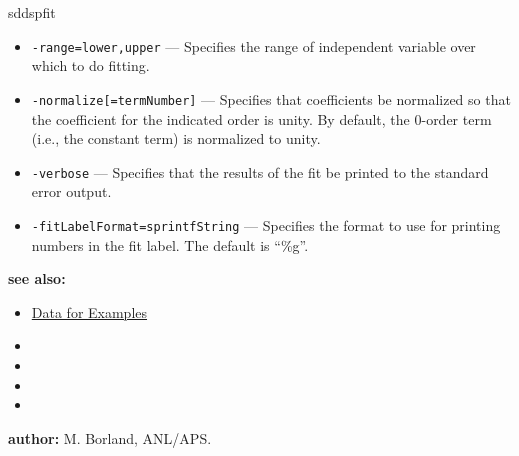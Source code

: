 \begin{sddsprog}{sddspfit}
\begin{itemize}
      \item \verb|-range=lower,upper| --- Specifies the range of independent variable over which to do fitting.
      \item \verb|-normalize[=termNumber]| --- Specifies that coefficients be normalized so that the coefficient for the indicated order is unity. By default, the 0-order term (i.e., the constant term) is normalized to unity.
      \item \verb|-verbose| --- Specifies that the results of the fit be printed to the standard error output.
      \item \verb|-fitLabelFormat=sprintfString| --- Specifies the format to use for printing numbers in the fit label. The default is ``\%g''.
    \end{itemize}
  \item \textbf{see also:}
    \begin{itemize}
      \item \hyperref[exampleData]{Data for Examples}
      \item {}
      \item {}
      \item {}
      \item {}
    \end{itemize}
  \item \textbf{author:} M. Borland, ANL/APS.
\end{sddsprog}
